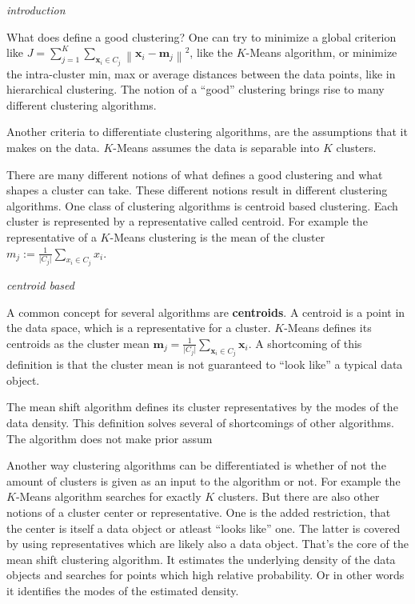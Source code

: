 \documentclass{article}
\newcommand{\norm}[1]{\left\lVert#1\right\rVert}
\begin{document}
\textit{introduction}

What does define a good clustering? One can try to minimize a global criterion like $J = \sum_{j=1}^K \sum_{\bm{x}_i \in C_j} \norm{\bm{x}_i - \bm{m}_j}^2$, like the $K$-Means algorithm, or minimize the intra-cluster min, max or average distances between the data points, like in hierarchical clustering. The notion of a ``good'' clustering brings rise to many different clustering algorithms.

Another criteria to differentiate clustering algorithms, are the assumptions that it makes on the data. $K$-Means assumes the data is separable into $K$ clusters. 

There are many different notions of what defines a good clustering and what shapes a cluster can take. These different notions result in different clustering algorithms. One class of clustering algorithms is centroid based clustering. Each cluster is represented by a representative called centroid. For example the representative of a $K$-Means clustering is the mean of the cluster $m_j := \frac{1}{\lvert C_j \rvert} \sum_{x_i \in C_j} x_i$.

\textit{centroid based}

A common concept for several algorithms are \textbf{centroids}. A centroid is a point in the data space, which is a representative for a cluster. $K$-Means defines its centroids as the cluster mean $\bm{m}_j = \frac{1}{\lvert C_j \rvert} \sum_{\bm{x}_i \in C_j} \bm{x}_i$. A shortcoming of this definition is that the cluster mean is not guaranteed to ``look like'' a typical data object.

The mean shift algorithm defines its cluster representatives by the modes of the data density. This definition solves several of shortcomings of other algorithms. The algorithm does not make prior assum


Another way clustering algorithms can be differentiated is whether of not the amount of clusters is given as an input to the algorithm or not. For example the $K$-Means algorithm searches for exactly $K$ clusters. But there are also other notions of a cluster center or representative. One is the added restriction, that the center is itself a data object or atleast ``looks like'' one. The latter is covered by using representatives which are likely also a data object. That's the core of the mean shift clustering algorithm. It estimates the underlying density of the data objects and searches for points which high relative probability. Or in other words it identifies the modes of the estimated density.
\end{document}
